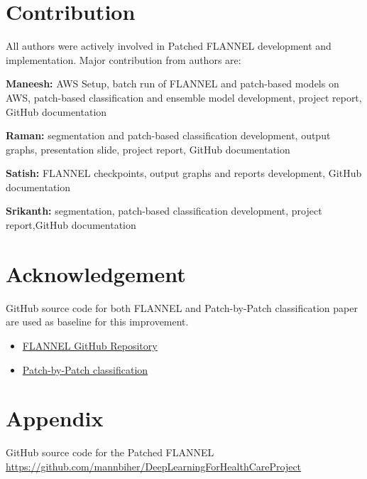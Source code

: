 \documentclass{sigkddExp}
\begin{document}
\section{Contribution}

All authors were actively involved in Patched FLANNEL development and
implementation. Major contribution from authors are:

\textbf{Maneesh:} AWS Setup, batch run of FLANNEL and patch-based models on
AWS, patch-based classification and ensemble model development, project
report, GitHub documentation

\textbf{Raman:} segmentation and patch-based classification development,
output graphs, presentation slide, project report, GitHub
documentation

\textbf{Satish:} FLANNEL checkpoints, output graphs and reports development,
GitHub documentation

\textbf{Srikanth:} segmentation, patch-based classification development, project
report,GitHub documentation

\section{Acknowledgement}
GitHub source code for both FLANNEL and Patch-by-Patch classification
\cite{pmid32396075} paper are used as baseline for this improvement.
\begin{itemize}
    \item \href{https://github.com/qxiaobu/FLANNEL}{FLANNEL GitHub Repository}
    \item \href{https://github.com/jongcye/Deep-Learning-COVID-19-on-CXR-using-Limited-Training-Data-Sets}
          {Patch-by-Patch classification}
\end{itemize}


\section{Appendix}
GitHub source code for the Patched FLANNEL
\url{https://github.com/mannbiher/DeepLearningForHealthCareProject}

\clearpage
%

\end{document}
